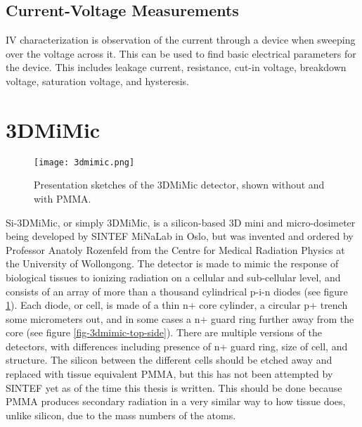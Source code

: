 \documentclass[../main/thesis.tex]{subfiles}
\begin{document}

\subsection{Current-Voltage Measurements}
\label{t-iv}
\gls{IV} characterization is observation of the current through a device when sweeping over the voltage across it. This can be used to find basic electrical parameters for the device. This includes leakage current, resistance, cut-in voltage, breakdown voltage, saturation voltage, and hysteresis. 

\section{3DMiMic}
\label{3d-3d}

\begin{figure}%
	\centering
	\texttt{[image: 3dmimic.png]}
	\caption{Presentation sketches of the 3DMiMic detector, shown without and with PMMA. \citep{Trento2015}}
	\label{fig-3dmimic}
\end{figure}

Si-3DMiMic, or simply 3DMiMic, is a silicon-based 3D mini and micro-dosimeter being developed by SINTEF MiNaLab in Oslo, but was invented and ordered by Professor Anatoly Rozenfeld from the Centre for Medical Radiation Physics at the University of Wollongong. The detector is made to mimic the response of biological tissues to ionizing radiation on a cellular and sub-cellular level, and consists of an array of more than a thousand cylindrical p-i-n diodes (see figure \ref{fig-3dmimic}). Each diode, or cell, is made of a thin n+ core cylinder, a circular p+ trench some micrometers out, and in some cases a n+ guard ring further away from the core (see figure \ref{fig-3dmimic-top-side}). There are multiple versions of the detectors, with differences including presence of n+ guard ring, size of cell, and structure. The silicon between the different cells should be etched away and replaced with tissue equivalent \gls{PMMA}, but this has not been attempted by SINTEF yet as of the time this thesis is written. This should be done because \gls{PMMA} produces secondary radiation in a very similar way to how tissue does, unlike silicon, due to the mass numbers of the atoms. 

\end{document}
